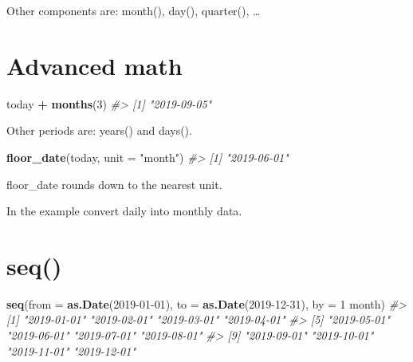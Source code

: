\documentclass[
]{book}
\newenvironment{Shaded}{\begin{snugshade}}{\end{snugshade}}
\newcommand{\AttributeTok}[1]{\textcolor[rgb]{0.13,0.29,0.53}{#1}}
\newcommand{\CommentTok}[1]{\textcolor[rgb]{0.56,0.35,0.01}{\textit{#1}}}
\newcommand{\DecValTok}[1]{\textcolor[rgb]{0.00,0.00,0.81}{#1}}
\newcommand{\FunctionTok}[1]{\textcolor[rgb]{0.13,0.29,0.53}{\textbf{#1}}}
\newcommand{\NormalTok}[1]{#1}
\newcommand{\SpecialCharTok}[1]{\textcolor[rgb]{0.81,0.36,0.00}{\textbf{#1}}}
\newcommand{\StringTok}[1]{\textcolor[rgb]{0.31,0.60,0.02}{#1}}
\begin{document}
Other components are: month(), day(), quarter(), \ldots{}

\section{Advanced math}\label{advanced-math}

\begin{Shaded}
\begin{Highlighting}[]
\NormalTok{today }\SpecialCharTok{+} \FunctionTok{months}\NormalTok{(}\DecValTok{3}\NormalTok{)}
\CommentTok{\#\textgreater{} [1] "2019{-}09{-}05"}
\end{Highlighting}
\end{Shaded}

Other periods are: years() and days().

\begin{Shaded}
\begin{Highlighting}[]
\FunctionTok{floor\_date}\NormalTok{(today, }\AttributeTok{unit =} \StringTok{"month"}\NormalTok{)}
\CommentTok{\#\textgreater{} [1] "2019{-}06{-}01"}
\end{Highlighting}
\end{Shaded}

floor\_date rounds down to the nearest unit.

In the example convert daily into monthly data.

\section*{seq()}\label{seq}

\begin{Shaded}
\begin{Highlighting}[]
\FunctionTok{seq}\NormalTok{(}\AttributeTok{from =} \FunctionTok{as.Date}\NormalTok{(}\StringTok{\textquotesingle{}2019{-}01{-}01\textquotesingle{}}\NormalTok{),}
    \AttributeTok{to =} \FunctionTok{as.Date}\NormalTok{(}\StringTok{\textquotesingle{}2019{-}12{-}31\textquotesingle{}}\NormalTok{),}
    \AttributeTok{by =} \StringTok{\textquotesingle{}1 month\textquotesingle{}}\NormalTok{)}
\CommentTok{\#\textgreater{}  [1] "2019{-}01{-}01" "2019{-}02{-}01" "2019{-}03{-}01" "2019{-}04{-}01"}
\CommentTok{\#\textgreater{}  [5] "2019{-}05{-}01" "2019{-}06{-}01" "2019{-}07{-}01" "2019{-}08{-}01"}
\CommentTok{\#\textgreater{}  [9] "2019{-}09{-}01" "2019{-}10{-}01" "2019{-}11{-}01" "2019{-}12{-}01"}
\end{Highlighting}
\end{Shaded}
\end{document}
